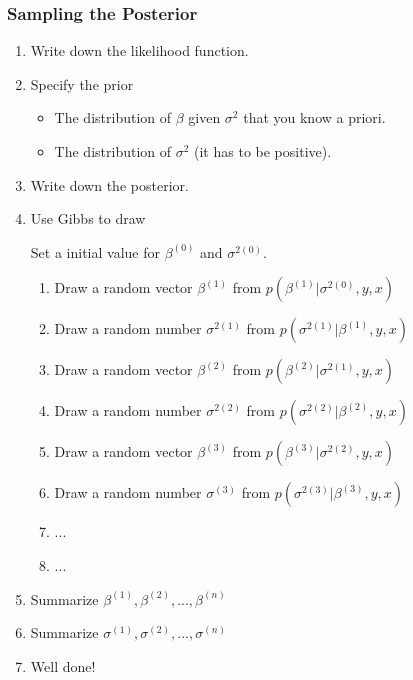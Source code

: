 \documentclass[10pt]{beamer}
\begin{document}
\begin{frame}
  \frametitle{Sampling the Posterior}

  \begin{enumerate}
  \item Write down the likelihood function.
  \item Specify the prior
    \begin{itemize}
    \item The distribution of $\beta$ given $\sigma^2$ that you know a
      priori.
    \item The distribution of $\sigma^2$ (it has to be positive).
    \end{itemize}

  \item Write down the posterior.

  \item Use Gibbs to draw

    Set a initial value for $\beta^{(0)}$ and $\sigma^{2(0)}$.

    \begin{enumerate}
    \item Draw a random vector $\beta^{(1)}$ from $p(\beta^{(1)} | \sigma^{2(0)},y,x)$
    \item Draw a random number $\sigma^{2(1)}$ from $p(\sigma^{2(1)}| \beta^{(1)} ,y,x)$
    \item Draw a random vector $\beta^{(2)}$ from $p(\beta^{(2)} | \sigma^{2(1)},y,x)$
    \item Draw a random number $\sigma^{2(2)}$ from $p(\sigma^{2(2)}| \beta^{(2)} ,y,x)$
    \item Draw a random vector $\beta^{(3)}$ from $p(\beta^{(3)} | \sigma^{2(2)},y,x)$
    \item Draw a random number $\sigma^{(3)}$ from $p(\sigma^{2(3)}| \beta^{(3)} ,y,x)$
    \item ...
    \item ...
    \end{enumerate}

  \item Summarize $\beta^{(1)},\beta^{(2)},...,\beta^{(n)}$
  \item Summarize $\sigma^{(1)},\sigma^{(2)},...,\sigma^{(n)}$

  \item Well done!

  \end{enumerate}

\end{frame}
\end{document}
